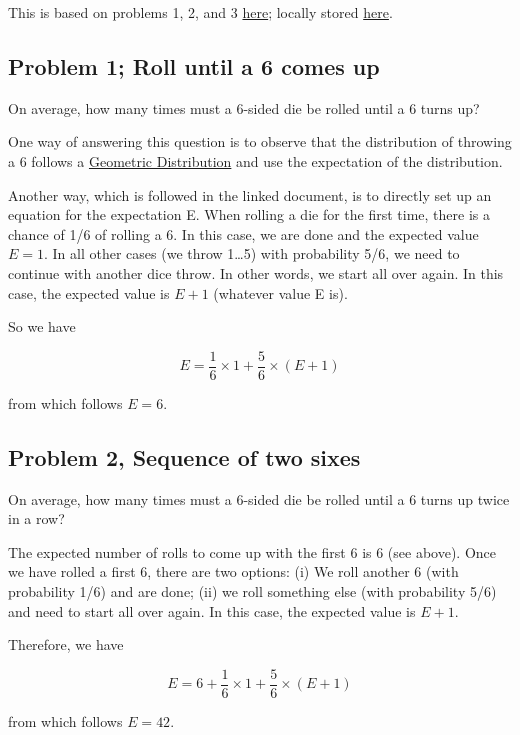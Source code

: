 
This is based on problems 1, 2, and 3
\href{http://www.madandmoonly.com/doctormatt/mathematics/dice1.pdf}{here};
locally stored \href{\%7Bfilename\%7D/files/dice1.pdf}{here}.

\subsection{Problem 1; Roll until a 6 comes up}

On average, how many times must a 6-sided die be rolled until a 6 turns
up?

One way of answering this question is to observe that the distribution
of throwing a 6 follows a
\href{\%7Bfilename\%7D2015-08-18-Geometric_Distribution.markdown}{Geometric
Distribution} and use the expectation of the distribution.

Another way, which is followed in the linked document, is to directly
set up an equation for the expectation E. When rolling a die for the
first time, there is a chance of 1/6 of rolling a 6. In this case, we
are done and the expected value \(E=1\). In all other cases (we throw
1\ldots{}5) with probability 5/6, we need to continue with another dice
throw. In other words, we start all over again. In this case, the
expected value is \(E+1\) (whatever value E is).

So we have

\[
E = \frac{1}{6} \times 1 + \frac{5}{6} \times (E+1)
\]

from which follows \(E=6\).

\subsection{Problem 2, Sequence of two sixes}

On average, how many times must a 6-sided die be rolled until a 6 turns
up twice in a row?

The expected number of rolls to come up with the first 6 is 6 (see
above). Once we have rolled a first 6, there are two options: (i) We
roll another 6 (with probability 1/6) and are done; (ii) we roll
something else (with probability 5/6) and need to start all over again.
In this case, the expected value is \(E+1\).

Therefore, we have

\[
E = 6 + \frac{1}{6} \times 1 + \frac{5}{6} \times (E+1)
\]

from which follows \(E=42\).

